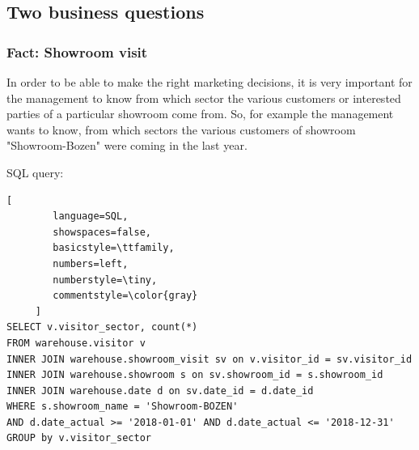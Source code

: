 \documentclass[letterpaper,12pt]{article}
\begin{document}
\subsection{Two business questions}

\subsubsection{Fact: Showroom visit}

In order to be able to make the right marketing decisions, it is very important for the management to know from which sector the various customers or interested parties of a particular showroom come from. So, for example the management wants to know, from which sectors the various customers of showroom "Showroom-Bozen" were coming in the last year.

\bigskip
\noindent SQL query:
\begin{lstlisting}[
        language=SQL,
        showspaces=false,
        basicstyle=\ttfamily,
        numbers=left,
        numberstyle=\tiny,
        commentstyle=\color{gray}
     ]
SELECT v.visitor_sector, count(*)
FROM warehouse.visitor v
INNER JOIN warehouse.showroom_visit sv on v.visitor_id = sv.visitor_id
INNER JOIN warehouse.showroom s on sv.showroom_id = s.showroom_id
INNER JOIN warehouse.date d on sv.date_id = d.date_id
WHERE s.showroom_name = 'Showroom-BOZEN' 
AND d.date_actual >= '2018-01-01' AND d.date_actual <= '2018-12-31'
GROUP by v.visitor_sector
\end{lstlisting}
\end{document}
